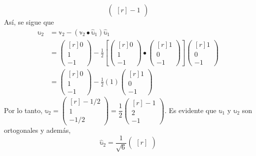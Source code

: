 \begin{example}
$$\begin{pmatrix*}[r]
        -1
    \end{pmatrix*}$$
    Así, se sigue que
    \begin{align*}
        \mathbb{u}_2 & = \mathbb{v}_2 - (\mathbb{v}_2 \bullet \hat{\mathbb{u}}_1)\hat{\mathbb{u}}_1 \\
        & = \begin{pmatrix*}[r]
            0 \\
            1 \\
            -1
        \end{pmatrix*} - \frac{1}{2} \left[ \begin{pmatrix*}[r]
            0 \\
            1 \\
            -1
        \end{pmatrix*} \bullet \begin{pmatrix*}[r]
            1 \\
            0 \\
            -1
        \end{pmatrix*} \right] \begin{pmatrix*}[r]
            1 \\
            0 \\
            -1
        \end{pmatrix*} \\
        & = \begin{pmatrix*}[r]
            0 \\
            1 \\
            -1
        \end{pmatrix*} - \frac{1}{2}(1) \begin{pmatrix*}[r]
            1 \\
            0 \\
            -1
        \end{pmatrix*}
    \end{align*}
    Por lo tanto, $\mathbb{u}_2 = \begin{pmatrix*}[r]
        -1/2 \\
        1 \\
        -1/2
    \end{pmatrix*} = \dfrac{1}{2} \begin{pmatrix*}[r]
        -1 \\
        2 \\
        -1
    \end{pmatrix*}$. Es evidente que $\mathbb{u}_1$ y $\mathbb{u}_2$ son ortogonales y además,
    $$\hat{\mathbb{u}}_2 = \frac{1}{\sqrt{6}} \begin{pmatrix*}[r]

\end{pmatrix*}$$
\end{example}
